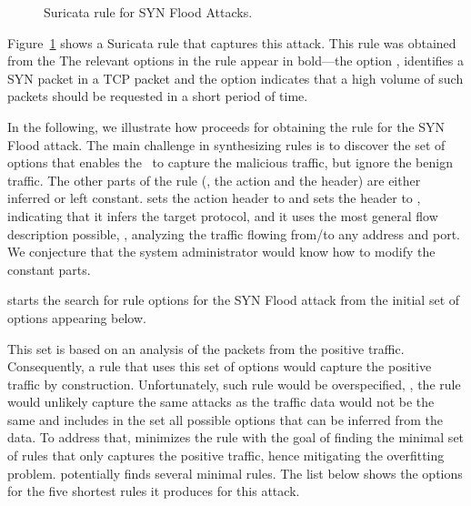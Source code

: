 \documentclass[runningheads]{llncs}
\begin{document}
\begin{figure}[h!]
  
  \caption{Suricata rule for SYN Flood Attacks.}
  \label{fig:synflood-example}
\end{figure}


Figure~\ref{fig:synflood-example} shows a Suricata rule that captures
this attack. This rule was obtained from the 
The relevant options in the rule appear in bold---the option
, identifies a SYN packet in a TCP packet and the
option  indicates that a high volume of such packets should be
requested in a short period of time.




In the following, we illustrate how \tname{} proceeds for obtaining
the rule for the SYN Flood attack. The main challenge in synthesizing
rules is to discover the set of options that enables the \nids\ to
capture the malicious traffic, but ignore the benign traffic.  The
other parts of the rule (\ie{}, the action and the header) are either
inferred or left constant. \tname{} sets the action header to
 and sets the header to , indicating that it infers the target protocol, and it uses the
most general flow description possible, \ie{}, analyzing the traffic
flowing from/to any address and port.  We conjecture that the system
administrator would know how to modify the constant parts.

\tname{} starts the search for rule options for the SYN Flood attack
from the initial set of options appearing below.


\begin{figure}[h!]
  \vspace{-3ex}
  
  \vspace{-3ex}  
\end{figure}

This set is based on an analysis of the packets from the positive
traffic. Consequently, a rule that uses this set of options would
capture the positive traffic by construction. Unfortunately, such rule
would be overspecified, \ie{}, the rule would unlikely capture the
same attacks as the traffic data would not be the same and \tname{}
includes in the set all possible options that can be inferred from the
data. To address that, \tname{} minimizes the rule with the goal of
finding the minimal set of rules that only captures the positive
traffic, hence mitigating the overfitting problem. \tname{}
potentially finds several minimal rules. The list below shows the
options for the five shortest rules it produces for this attack.
\end{document}
